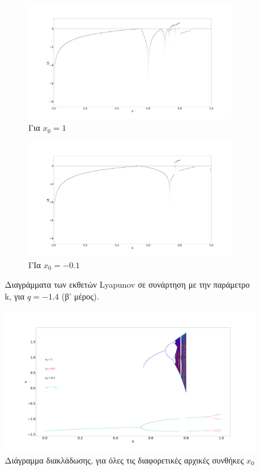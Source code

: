 \begin{figure}[ht]
	\centering
	
	\begin{subfigure}[b]{1\textwidth}
		\centering
		\includegraphics[width=\textwidth]{LateX images/graphs q14/g8}
		\caption{Για \(x_0=1\)}
		\label{f:g25}
	\end{subfigure}
	\hfill
	\begin{subfigure}[b]{1\textwidth}
		\centering
		\includegraphics[width=\textwidth]{LateX images/graphs q14/g9}
		\caption{ΓΙα \(x_0=-0.1\)}
		\label{f:g26}
	\end{subfigure}
	\hfill
	\caption{ Διαγράμματα των εκθετών Lyapunov σε συνάρτηση με την παράμετρο k, για  $q=-1.4$ (β' μέρος).}
	\label{f:g2333}
\end{figure}

\begin{figure}[ht]
	\centering
	\includegraphics[width=1\linewidth]{LateX images/graphs q14/g30}
	\caption{Διάγραμμα διακλάδωσης, για όλες τις διαφορετικές αρχικές συνθήκες $x_0$}
	\label{f:g231}
\end{figure}

